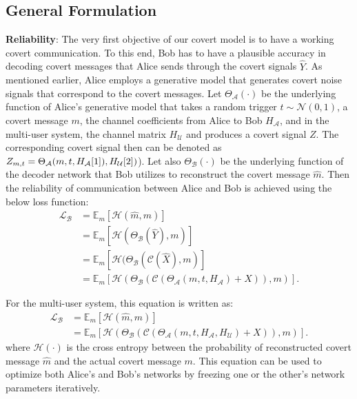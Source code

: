 \subsection{General Formulation}
\textbf{Reliability}: The very first objective of our covert model is to have a working covert communication. To this end, Bob has to have a plausible accuracy in decoding covert messages that Alice sends through the covert signals \(\hat{Y}\). As mentioned earlier, Alice employs a generative model that generates covert noise signals that correspond to the covert messages. Let \(\Theta_{\mathcal{A}}(\cdot)\) be the underlying function of Alice's generative model that takes a random trigger \(t \sim \mathcal{N}(0, 1)\), a covert message \(m\), the channel coefficients from Alice to Bob \(H_{\mathcal{A}}\), and in the multi-user system, the channel matrix \(H_{\mathcal{U}}\) and produces a covert signal \(Z\). The corresponding covert signal then can be denoted as \(Z_{m, t} = \Theta_{\mathcal{A}}(m, t, H_{\mathcal{A}}[1]), H_{\mathcal{U}}[2])\)). Let also  \(\Theta_{\mathcal{B}}(\cdot)\) be the underlying function of the decoder network that Bob utilizes to reconstruct the covert message \(\hat{m}\). Then the reliability of communication between Alice and Bob is achieved using the below loss function:
\begin{equation}
	\begin{aligned} \label{bob_loss}
	\mathcal{L}_{\mathcal{B}} & = \mathbb{E}_{m}[\mathcal{H}(\hat{m}, m)] \\
	& = \mathbb{E}_{m}[\mathcal{H}(\Theta_{\mathcal{B}}(\hat{Y}), m)] \\ 
	& = \mathbb{E}_{m}[\mathcal{H}(\Theta_{\mathcal{B}}(\mathcal{C}(\hat{X}), m)] \\ 
	& = \mathbb{E}_{m}[\mathcal{H}(\Theta_{\mathcal{B}}(\mathcal{C}(\Theta_{\mathcal{A}}(m, t, H_{\mathcal{A}}) + X)), m)].
	\end{aligned}
\end{equation}

For the multi-user system, this equation is written as:
\begin{equation}
	\begin{aligned}
		\mathcal{L}_{\mathcal{B}} & = \mathbb{E}_{m}[\mathcal{H}(\hat{m}, m)] \\
		& = \mathbb{E}_{m}[\mathcal{H}(\Theta_{\mathcal{B}}(\mathcal{C}(\Theta_{\mathcal{A}}(m, t, H_{\mathcal{A}}, H_{\mathcal{U}}) + X)), m)].
	\end{aligned}
\end{equation}
where \(\mathcal{H}(\cdot)\) is the cross entropy between the probability of reconstructed covert message \(\hat{m}\) and the actual covert message \(m\). This equation can be used to optimize both Alice's and Bob's networks by freezing one or the other's network parameters iteratively. 

